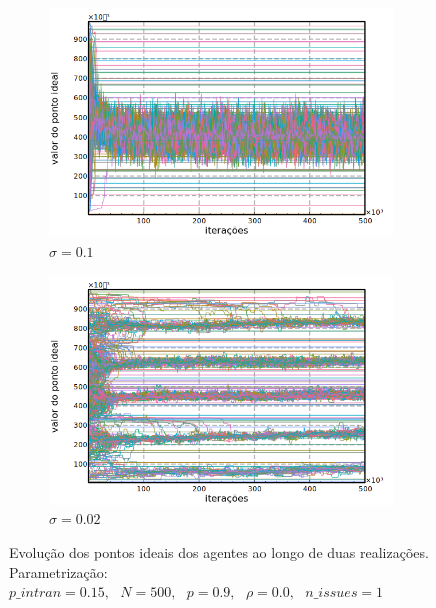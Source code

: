 \begin{figure}[H]
    \centering
    \begin{subfigure}[b]{0.49\textwidth}
      \includegraphics[width=\textwidth]{ims/timeseries3.png}
      \caption{\( \sigma = 0.1\) }
    \end{subfigure}
    \begin{subfigure}[b]{0.49\textwidth}
      \includegraphics[width=\textwidth]{ims/timeseries4.png}
       \caption{\(\sigma = 0.02\) }
      \end{subfigure}
      \caption{Evolução dos pontos ideais dos agentes ao longo de duas realizações.
        Parametrização: \(p\_intran = 0.15, \text{ } N = 500,  \text{ }   p =
        0.9,  \text{ }  \rho = 0.0,  \text{ }  n\_issues = 1 \)}
      \label{fig:tseries2}
    \end{figure}
    
